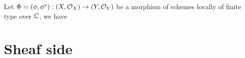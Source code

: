 \begin{corollary}
  Let $\Phi = (\phi, \phi^{*}) : \left(X, \mathcal{O}_{X}\right) \to \left(Y, \mathcal{O}_{Y}\right)$ be a morphism of schemes locally of finite type over $\mathbb{C}$, we have
  \begin{center}
  \end{center}
\end{corollary}


\section{Sheaf side}
